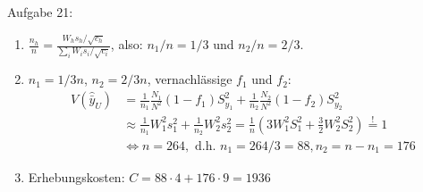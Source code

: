 \begin{Solution}{{Aufgabe 21:}}
\begin{enumerate}
	\item $\frac{n_h}{n}=\frac{W_h s_h / \sqrt{c_h}}{\sum_i W_i s_i / \sqrt{c_i}}$, also: $n_1/n = 1/3$ und $n_2/n=2/3$.
	\item $n_1 = 1/3n$, $n_2=2/3 n$, vernachlässige $f_{1}$ und $f_2$:
	\begin{align*}
	V(\hat{\bar{y}}_U) &= \frac{1}{n_1}\frac{N_1}{N^2}(1-f_1)S_{y_1}^2 + \frac{1}{n_2}\frac{N_2}{N^2}(1-f_2)S_{y_2}^2\\
	&\approx \frac{1}{n_1}W_1^2 s_1^2 + \frac{1}{n_2}W_2^2 s_2^2 = \frac{1}{n}(3 W_1^2 S_1^2 + \frac{3}{2} W_2^2 S_2^2) \overset{!}{=} 1\\
	&\Leftrightarrow n =264, \text{ d.h. } n_1=264/3 = 88, n_2 = n-n_1 = 176
	\end{align*}
	\item Erhebungskosten: $C=88 \cdot 4 + 176 \cdot 9 = 1936$
\end{enumerate}

\end{Solution}
